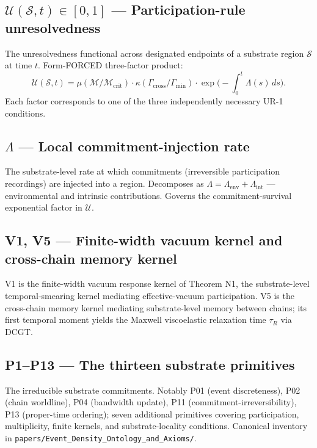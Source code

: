 \documentclass[11pt]{book}
\begin{document}
\subsection{$\mathcal{U}(\mathcal{S},t) \in [0,1]$ — Participation-rule unresolvedness}

The unresolvedness functional across designated endpoints of a substrate region $\mathcal{S}$ at time $t$. Form-FORCED three-factor product:
\[
\mathcal{U}(\mathcal{S},t) = \mu(\mathcal{M}/\mathcal{M}_\mathrm{crit}) \cdot \kappa(\Gamma_\mathrm{cross}/\Gamma_\mathrm{min}) \cdot \exp\!\Big(-\!\!\int_0^t \Lambda(s)\,ds\Big).
\]
Each factor corresponds to one of the three independently necessary UR-1 conditions.

\subsection{$\Lambda$ — Local commitment-injection rate}

The substrate-level rate at which commitments (irreversible participation recordings) are injected into a region. Decomposes as $\Lambda = \Lambda_\mathrm{env} + \Lambda_\mathrm{int}$ — environmental and intrinsic contributions. Governs the commitment-survival exponential factor in $\mathcal{U}$.

\subsection{V1, V5 — Finite-width vacuum kernel and cross-chain memory kernel}

V1 is the finite-width vacuum response kernel of Theorem N1, the substrate-level temporal-smearing kernel mediating effective-vacuum participation. V5 is the cross-chain memory kernel mediating substrate-level memory between chains; its first temporal moment yields the Maxwell viscoelastic relaxation time $\tau_R$ via DCGT.

\subsection{P1–P13 — The thirteen substrate primitives}

The irreducible substrate commitments. Notably P01 (event discreteness), P02 (chain worldline), P04 (bandwidth update), P11 (commitment-irreversibility), P13 (proper-time ordering); seven additional primitives covering participation, multiplicity, finite kernels, and substrate-locality conditions. Canonical inventory in \texttt{papers/Event\_Density\_Ontology\_and\_Axioms/}.
\end{document}
